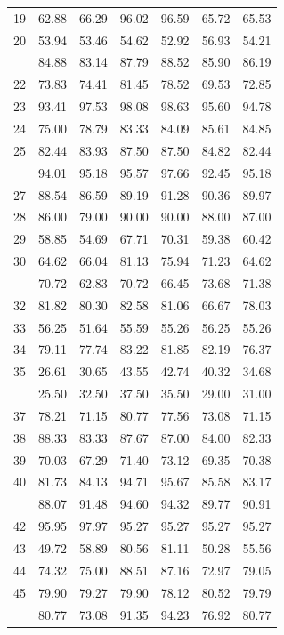 \documentclass[]{elsarticle} %
\begin{document}
\begin{longtable}[t]{rrrrrrr}
19 & 62.88 & 66.29 & 96.02 & 96.59 & 65.72 & 65.53\\
20 & 53.94 & 53.46 & 54.62 & 52.92 & 56.93 & 54.21\\
\addlinespace
21 & 84.88 & 83.14 & 87.79 & 88.52 & 85.90 & 86.19\\
22 & 73.83 & 74.41 & 81.45 & 78.52 & 69.53 & 72.85\\
23 & 93.41 & 97.53 & 98.08 & 98.63 & 95.60 & 94.78\\
24 & 75.00 & 78.79 & 83.33 & 84.09 & 85.61 & 84.85\\
25 & 82.44 & 83.93 & 87.50 & 87.50 & 84.82 & 82.44\\
\addlinespace
26 & 94.01 & 95.18 & 95.57 & 97.66 & 92.45 & 95.18\\
27 & 88.54 & 86.59 & 89.19 & 91.28 & 90.36 & 89.97\\
28 & 86.00 & 79.00 & 90.00 & 90.00 & 88.00 & 87.00\\
29 & 58.85 & 54.69 & 67.71 & 70.31 & 59.38 & 60.42\\
30 & 64.62 & 66.04 & 81.13 & 75.94 & 71.23 & 64.62\\
\addlinespace
31 & 70.72 & 62.83 & 70.72 & 66.45 & 73.68 & 71.38\\
32 & 81.82 & 80.30 & 82.58 & 81.06 & 66.67 & 78.03\\
33 & 56.25 & 51.64 & 55.59 & 55.26 & 56.25 & 55.26\\
34 & 79.11 & 77.74 & 83.22 & 81.85 & 82.19 & 76.37\\
35 & 26.61 & 30.65 & 43.55 & 42.74 & 40.32 & 34.68\\
\addlinespace
36 & 25.50 & 32.50 & 37.50 & 35.50 & 29.00 & 31.00\\
37 & 78.21 & 71.15 & 80.77 & 77.56 & 73.08 & 71.15\\
38 & 88.33 & 83.33 & 87.67 & 87.00 & 84.00 & 82.33\\
39 & 70.03 & 67.29 & 71.40 & 73.12 & 69.35 & 70.38\\
40 & 81.73 & 84.13 & 94.71 & 95.67 & 85.58 & 83.17\\
\addlinespace
41 & 88.07 & 91.48 & 94.60 & 94.32 & 89.77 & 90.91\\
42 & 95.95 & 97.97 & 95.27 & 95.27 & 95.27 & 95.27\\
43 & 49.72 & 58.89 & 80.56 & 81.11 & 50.28 & 55.56\\
44 & 74.32 & 75.00 & 88.51 & 87.16 & 72.97 & 79.05\\
45 & 79.90 & 79.27 & 79.90 & 78.12 & 80.52 & 79.79\\
\addlinespace
46 & 80.77 & 73.08 & 91.35 & 94.23 & 76.92 & 80.77\\

\end{longtable}
\end{document}
